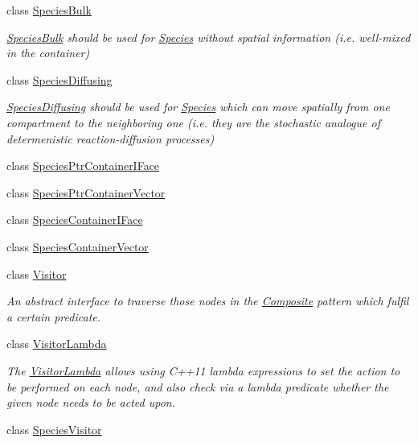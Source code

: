 \begin{DoxyCompactItemize}
class \hyperlink{classchem_1_1SpeciesBulk}{Species\-Bulk}
\begin{DoxyCompactList}\small\item\em \hyperlink{classchem_1_1SpeciesBulk}{Species\-Bulk} should be used for \hyperlink{classchem_1_1Species}{Species} without spatial information (i.\-e. well-\/mixed in the container) \end{DoxyCompactList}\item 
class \hyperlink{classchem_1_1SpeciesDiffusing}{Species\-Diffusing}
\begin{DoxyCompactList}\small\item\em \hyperlink{classchem_1_1SpeciesDiffusing}{Species\-Diffusing} should be used for \hyperlink{classchem_1_1Species}{Species} which can move spatially from one compartment to the neighboring one (i.\-e. they are the stochastic analogue of determenistic reaction-\/diffusion processes) \end{DoxyCompactList}\item 
class \hyperlink{classchem_1_1SpeciesPtrContainerIFace}{Species\-Ptr\-Container\-I\-Face}
\item 
class \hyperlink{classchem_1_1SpeciesPtrContainerVector}{Species\-Ptr\-Container\-Vector}
\item 
class \hyperlink{classchem_1_1SpeciesContainerIFace}{Species\-Container\-I\-Face}
\item 
class \hyperlink{classchem_1_1SpeciesContainerVector}{Species\-Container\-Vector}
\item 
class \hyperlink{classchem_1_1Visitor}{Visitor}
\begin{DoxyCompactList}\small\item\em An abstract interface to traverse those nodes in the \hyperlink{classchem_1_1Composite}{Composite} pattern which fulfil a certain predicate. \end{DoxyCompactList}\item 
class \hyperlink{classchem_1_1VisitorLambda}{Visitor\-Lambda}
\begin{DoxyCompactList}\small\item\em The \hyperlink{classchem_1_1VisitorLambda}{Visitor\-Lambda} allows using C++11 lambda expressions to set the action to be performed on each node, and also check via a lambda predicate whether the given node needs to be acted upon. \end{DoxyCompactList}\item 
class \hyperlink{classchem_1_1SpeciesVisitor}{Species\-Visitor}
\item 

\end{DoxyCompactItemize}
